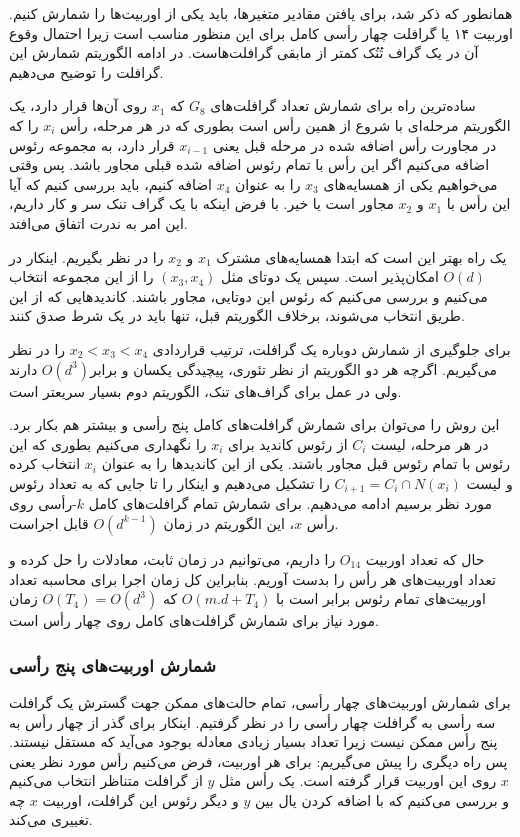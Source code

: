 همانطور که ذکر شد، برای یافتن مقادیر متغیرها، باید یکی از اوربیت‌ها را شمارش کنیم. اوربیت ۱۴ یا گرافلت چهار رأسی کامل برای این منظور مناسب است زیرا احتمال وقوع آن در یک گراف تُنُک کمتر از مابقی گرافلت‌هاست. در ادامه الگوریتم شمارش این گرافلت را توضیح می‌دهیم.

ساده‌ترین راه برای شمارش تعداد گرافلت‌های $G_8$ که $x_1$ روی آن‌ها قرار دارد، یک الگوریتم مرحله‌ای با شروع از همین رأس است بطوری که در هر مرحله، رأس $x_i$ را که در مجاورت رأس اضافه شده در مرحله قبل یعنی $x_{i-1}$ قرار دارد، به مجموعه رئوس اضافه می‌کنیم اگر این رأس با تمام رئوس اضافه شده قبلی مجاور باشد. پس وقتی می‌خواهیم یکی از همسایه‌های $x_3$ را به عنوان $x_4$ اضافه کنیم، باید بررسی کنیم که آیا این رأس با $x_1$ و $x_2$ مجاور است یا خیر. با فرض اینکه با یک گراف تنک سر و کار داریم، این امر به ندرت اتفاق می‌افتد.

یک راه بهتر این است که ابتدا همسایه‌های مشترک $x_1$ و $x_2$ را در نظر بگیریم. اینکار در $O(d)$ امکان‌پذیر است. سپس یک دوتای مثل $(x_3,x_4)$ را از این مجموعه انتخاب می‌کنیم و بررسی می‌کنیم که رئوس این دوتایی، مجاور باشند. کاندید‌هایی که از این طریق انتخاب می‌شوند، برخلاف الگوریتم قبل، تنها باید در یک شرط صدق کنند.

برای جلوگیری از شمارش دوباره یک گرافلت، ترتیب قراردادی $x_2 < x_3 < x_4$ را در نظر می‌گیریم. اگرچه هر دو الگوریتم از نظر تئوری، پیچیدگی یکسان و برابر$O(d^3)$ دارند ولی در عمل برای گراف‌های تنک، الگوریتم دوم بسیار سریعتر است.

این روش را می‌توان برای شمارش گرافلت‌های کامل پنج رأسی و بیشتر هم بکار برد. در هر مرحله، لیست $C_i$ از رئوس کاندید برای $x_i$ را نگهداری می‌کنیم بطوری که این رئوس با تمام رئوس قبل مجاور باشند. یکی از این کاندیدها را به عنوان $x_i$ انتخاب کرده و لیست $C_{i+1} = C_i\cap N(x_i)$ را تشکیل می‌دهیم و اینکار را تا جایی که به تعداد رئوس مورد نظر برسیم ادامه می‌دهیم. برای شمارش تمام گرافلت‌های کامل $k$-رأسی روی رأس $x$، این الگوریتم در زمان $O(d^{k-1})$ قابل اجراست.

حال که تعداد اوربیت $O_{14}$ را داریم، می‌توانیم در زمان ثابت، معادلات را حل کرده و تعداد اوربیت‌های هر رأس را بدست آوریم. بنابراین کل زمان اجرا برای محاسبه تعداد اوربیت‌های تمام رئوس برابر است با $O(m.d+T_4)$ که $O(T_4) = O(d^3)$ زمان مورد نیاز برای شمارش گرافلت‌های کامل روی چهار رأس است.

\subsubsection{شمارش اوربیت‌های پنج رأسی}
برای شمارش اوربیت‌های چهار رأسی، تمام حالت‌های ممکن جهت گسترش یک گرافلت سه رأسی به گرافلت چهار رأسی را در نظر گرفتیم. اینکار برای گذر از چهار رأس به پنج رأس ممکن نیست زیرا تعداد بسیار زیادی معادله بوجود می‌آید که مستقل نیستند. پس راه دیگری را پیش می‌گیریم: برای هر اوربیت، فرض می‌کنیم رأس مورد نظر یعنی $x$ روی این اوربیت قرار گرفته است. یک رأس مثل $y$ از گرافلت متناظر انتخاب می‌کنیم و بررسی می‌کنیم که با اضافه کردن یال بین $y$ و دیگر رئوس این گرافلت، اوربیت $x$ چه تغییری می‌کند.

